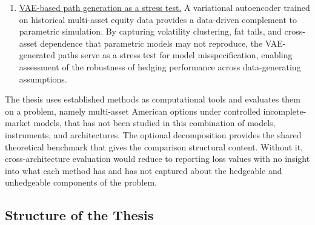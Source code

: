 \begin{enumerate}
\item \underline{VAE-based path generation as a stress test.}
  A variational autoencoder trained on historical multi-asset equity data
  provides a data-driven complement to parametric simulation.  By
  capturing volatility clustering, fat tails, and cross-asset dependence
  that parametric models may not reproduce, the VAE-generated paths serve
  as a stress test for model misspecification, enabling assessment of the
  robustness of hedging performance across data-generating assumptions.
\end{enumerate}

The thesis uses established methods as computational tools and evaluates
them on a problem, namely multi-asset American options under controlled
incomplete-market models, that has not been studied in this combination
of models, instruments, and architectures.  The optional decomposition
provides the shared theoretical benchmark that gives the comparison
structural content. Without it, cross-architecture evaluation would reduce
to reporting loss values with no insight into what each method has and has
not captured about the hedgeable and unhedgeable components of the problem.

\subsection{Structure of the Thesis}
\label{subsec:thesis_outline}

